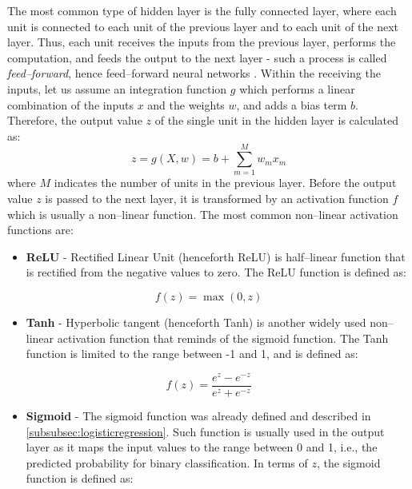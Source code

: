 The most common type of hidden layer is the fully connected layer, where each unit is connected to each unit of the previous layer and to each unit of the next layer.
Thus, each unit receives the inputs from the previous layer, performs the computation, and feeds the output to the next layer - such a process is called \textit{feed--forward}, hence feed--forward neural networks \citep{charu2018neural}.
Within the receiving the inputs, let us assume an integration function $g$ which performs a linear combination of the inputs $x$ and the weights $w$, and adds a bias term $b$.
Therefore, the output value $z$ of the single unit in the hidden layer is calculated as:
\begin{equation}
 z = g\left(X,w\right)= b + \sum_{m=1}^{M} w_m x_m
\end{equation}
where $M$ indicates the number of units in the previous layer.
Before the output value $z$ is passed to the next layer, it is transformed by an activation function $f$ which is usually a non--linear function. The most common non--linear activation functions are:
\begin{itemize}\setlength\itemsep{0cm}
\item \textbf{ReLU} - Rectified Linear Unit (henceforth ReLU) is half--linear function that is rectified from the negative values to zero. The ReLU function is defined as:
\end{itemize}
\begin{equation}
 f(z) = \max(0,z)
\end{equation}
\begin{itemize}\setlength\itemsep{0cm}
\item \textbf{Tanh} - Hyperbolic tangent (henceforth Tanh) is another widely used non--linear activation function that reminds of the sigmoid function. The Tanh function is limited to the range between -1 and 1, and is defined as:
 \end{itemize}
\begin{equation}
 f(z) = \frac{e^z - e^{-z}}{e^z + e^{-z}}
\end{equation}
\begin{itemize}\setlength\itemsep{0cm}
 \item \textbf{Sigmoid} - The sigmoid function was already defined and described in \autoref{subsubsec:logisticregression}. Such function is usually used in the output layer as it maps the input values to the range between 0 and 1, i.e., the predicted probability for binary classification. In terms of $z$, the sigmoid function is defined as:
\end{itemize}
